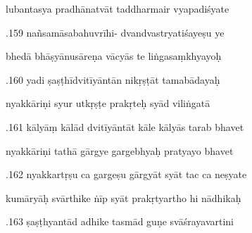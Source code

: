 \documentclass[article,12pt,a4paper]{memoir}%
\newcounter{parCount}
\begin{document}
	  
	  \pstart \leavevmode%
	lubantasya pradhānatvāt taddharmair vyapadiśyate 
	{}
	\pend%
      

	  
	  \pstart {}.159 nañsamāsabahuvrīhi- dvandvastryatiśayeṣu ye 
	{}
	\pend%
      

	  
	  \pstart \leavevmode%
	bhedā bhāṣyānusāreṇa vācyās te liṅgasaṃkhyayoḥ 
	{}
	\pend%
      

	  
	  \pstart {}.160 yadi ṣaṣṭhīdvitīyāntān nikṛṣṭāt tamabādayaḥ 
	{}
	\pend%
      

	  
	  \pstart \leavevmode%
	nyakkāriṇi syur utkṛṣṭe prakṛteḥ syād viliṅgatā 
	{}
	\pend%
      

	  
	  \pstart {}.161 kālyāṃ kālād dvitīyāntāt kāle kālyās tarab bhavet 
	{}
	\pend%
      

	  
	  \pstart \leavevmode%
	nyakkāriṇi tathā gārgye gargebhyaḥ pratyayo bhavet 
	{}
	\pend%
      

	  
	  \pstart {}.162 nyakkartṛṣu ca gargeṣu gārgyāt syāt tac ca neṣyate 
	{}
	\pend%
      

	  
	  \pstart \leavevmode%
	kumāryāḥ svārthike ṅīp syāt prakṛtyartho hi nādhikaḥ 
	{}
	\pend%
      

	  
	  \pstart {}.163 ṣaṣṭhyantād adhike tasmād guṇe svāśrayavartini 
	{}
	\pend%
      
\end{document}
